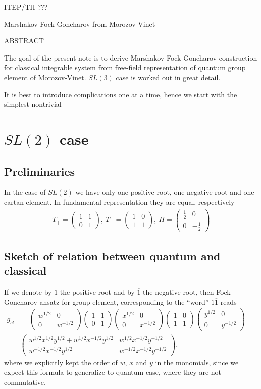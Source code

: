 \documentclass{paper}
\def\be{\begin{eqnarray}}
\def\ee{\end{eqnarray}}
\def\lb{\left (}
\def\rb{\right )}
\newcommand{\matd}[4]{\lb \begin{array}{cc}
#1 & #2 \\ #3 & #4
\end{array} \rb}
\newcommand{\Honed}[1]{\lb \begin{array}{ccc}
#1^{1/2} & 0 \\ 0 & #1^{-1/2}
\end{array} \rb}
\newcommand{\Eoned}[1]{\lb \begin{array}{cc}
1 & #1 \\ 0 & 1
\end{array} \rb}
\newcommand{\Foned}[1]{\lb \begin{array}{cc}
1 & 0 \\ #1 & 1
\end{array} \rb}
\begin{document}
\thispagestyle{empty}

\baselineskip14pt

\hfill ITEP/TH-???

\bigskip

\bigskip

\centerline{\LARGE{Marshakov-Fock-Goncharov from Morozov-Vinet}}

\centerline{ABSTRACT}

\bigskip

{\footnotesize
The goal of the present note is to derive Marshakov-Fock-Goncharov construction for
classical integrable system from free-field representation of quantum group element of Morozov-Vinet.
$SL(3)$ case is worked out in great detail.
}

It is best to introduce complications one at a time, hence we start with the simplest nontrivial

\section {$SL(2)$ case}

\subsection{Preliminaries}
In the case of $SL(2)$ we have only one positive root, one negative root and one cartan element.
In fundamental representation they are equal, respectively
\be
T_+ = \Eoned{1},\ T_- = \Foned{1},\ H = \matd{\frac{1}{2}}{0}{0}{-\frac{1}{2}}
\ee

\subsection{Sketch of relation between quantum and classical}

If we denote by $1$ the positive root and by $\overline{1}$ the negative root,
then Fock-Goncharov ansatz for group element, corresponding to the ``word'' $1\overline{1}$
reads
\be
g_{cl} & = \Honed{w} \Eoned{1} \Honed{x} \Foned{1} \Honed{y} = & \\
& \matd{w^{1/2}x^{1/2}y^{1/2} + w^{1/2}x^{-1/2}y^{1/2}}{w^{1/2}x^{-1/2}y^{-1/2}}
{w^{-1/2}x^{-1/2}y^{1/2}}{w^{-1/2}x^{-1/2}y^{-1/2}},
\label{g_classd}
\ee
where we explicitly kept the order of $w$, $x$ and $y$ in the monomials, since we expect this formula to
generalize to quantum case, where they are not commutative.
\end{document}
